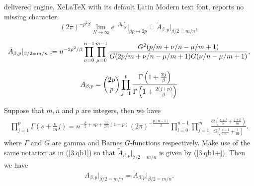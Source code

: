 \documentclass[10pt,a4paper]{amsart}
\begin{document}
delivered engine, XeLaTeX with its default Latin Modern text font, reports no missing character.
   \begin{equation}\label{3.qb1}
(2 \pi )^{-p^2 \beta} \lim_{N \to \infty}e^{-\beta \mu^*_N} \Big |_{\beta p \mapsto 2p}
=  \tilde{A}_{\beta,p} |_{\beta/2=m/n},
\end{equation}

\begin{equation}\label{3.qb1+}
\tilde{A}_{\beta,p} |_{\beta/2=m/n} := n^{-2 p^2/\beta}
\prod_{\nu=0}^{n-1} \prod_{\mu=0}^{m-1}
{ G^2(p/m+\nu/n-\mu/m+1) \over
G(2p/m+\nu/n-\mu/m+1) G(\nu/n-\mu/m+1) },
\end{equation}

        \begin{align}\label{A-the-const}
		A_{\beta, p}=\binom{2p}{p}\prod_{j=1}^{p}{\Gamma\left(1+{2j\over\beta}\right)\over\Gamma\left(1+{2(j+p)\over\beta}\right)} 
    \end{align}

\begin{prop}\label{G-gam-eq}
    Suppose that $m,n$ and $p$ are integers, then we have
\begin{align}\label{1.18}
    \prod_{j=1}^{p}\Gamma\left(s+\frac{n}{m}j\right)=n^{-\frac{p}{2}+sp+\frac{np}{2m}(1+p)}(2\pi)^{-\frac{p(n-1)}{2}}\prod_{l=0}^{n-1}\prod_{j=1}^{m}\frac{G\left(\frac{s+l}{n}+\frac{j+p}{m}\right)}{G\left(\frac{s+l}{n}+\frac{j}{m}\right)}.
\end{align}
where $\Gamma$ and $G$ are gamma and Barnes $G$-functions respectively. Make use of the same notation as in (\ref{3.qb1}) so that  $\tilde{A}_{\beta,p} |_{\beta/2=m/n}$ is given by (\ref{3.qb1+}). Then we have
\begin{equation}\label{1.18a}
A_{\beta,p} \Big |_{\beta/2=m/n} = \tilde{A}_{\beta,p} \Big |_{\beta/2=m/n}.
\end{equation}
\end{prop}
\end{document}
